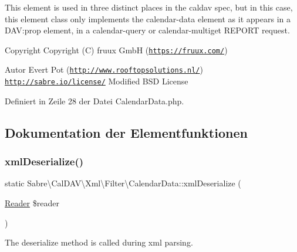 This element is used in three distinct places in the caldav spec, but in this case, this element class only implements the calendar-\/data element as it appears in a D\+AV\+:prop element, in a calendar-\/query or calendar-\/multiget R\+E\+P\+O\+RT request.

\begin{DoxyCopyright}{Copyright}
Copyright (C) fruux GmbH (\href{https://fruux.com/}{\tt https\+://fruux.\+com/}) 
\end{DoxyCopyright}
\begin{DoxyAuthor}{Autor}
Evert Pot (\href{http://www.rooftopsolutions.nl/}{\tt http\+://www.\+rooftopsolutions.\+nl/})  \href{http://sabre.io/license/}{\tt http\+://sabre.\+io/license/} Modified B\+SD License 
\end{DoxyAuthor}


Definiert in Zeile 28 der Datei Calendar\+Data.\+php.



\subsection{Dokumentation der Elementfunktionen}
\mbox{\label{class_sabre_1_1_cal_d_a_v_1_1_xml_1_1_filter_1_1_calendar_data_acdcd5c6c8917760b3dd15bd10c4c7af3}} 
\subsubsection{\texorpdfstring{xml\+Deserialize()}{xmlDeserialize()}}
{\footnotesize\ttfamily static Sabre\textbackslash{}\+Cal\+D\+A\+V\textbackslash{}\+Xml\textbackslash{}\+Filter\textbackslash{}\+Calendar\+Data\+::xml\+Deserialize (\begin{DoxyParamCaption}\item[{\mbox{\hyperlink{class_sabre_1_1_xml_1_1_reader}{Reader}}}]{\$reader }\end{DoxyParamCaption})\hspace{0.3cm}{\ttfamily [static]}}

The deserialize method is called during xml parsing.

